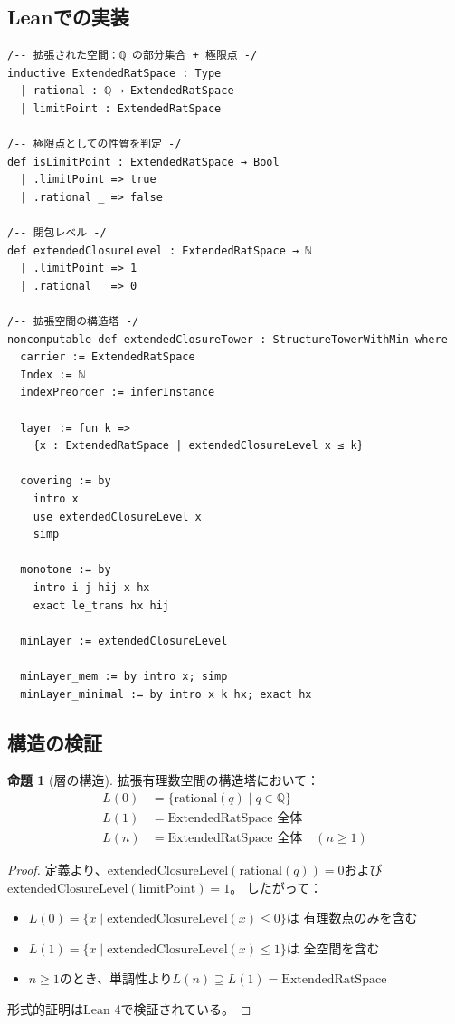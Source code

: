 \documentclass[a4paper,12pt]{ltjsarticle}
\theoremstyle{definition}
\newtheorem{proposition}[definition]{命題}
\begin{document}
\subsection{Leanでの実装}

\begin{lstlisting}[language=Lean]
/-- 拡張された空間：ℚ の部分集合 + 極限点 -/
inductive ExtendedRatSpace : Type
  | rational : ℚ → ExtendedRatSpace
  | limitPoint : ExtendedRatSpace

/-- 極限点としての性質を判定 -/
def isLimitPoint : ExtendedRatSpace → Bool
  | .limitPoint => true
  | .rational _ => false

/-- 閉包レベル -/
def extendedClosureLevel : ExtendedRatSpace → ℕ
  | .limitPoint => 1
  | .rational _ => 0

/-- 拡張空間の構造塔 -/
noncomputable def extendedClosureTower : StructureTowerWithMin where
  carrier := ExtendedRatSpace
  Index := ℕ
  indexPreorder := inferInstance

  layer := fun k =>
    {x : ExtendedRatSpace | extendedClosureLevel x ≤ k}

  covering := by
    intro x
    use extendedClosureLevel x
    simp

  monotone := by
    intro i j hij x hx
    exact le_trans hx hij

  minLayer := extendedClosureLevel

  minLayer_mem := by intro x; simp
  minLayer_minimal := by intro x k hx; exact hx
\end{lstlisting}

\subsection{構造の検証}

\begin{proposition}[層の構造]
拡張有理数空間の構造塔において：
\begin{align*}
L(0) &= \{\mathrm{rational}(q) \mid q \in \mathbb{Q}\} \\
L(1) &= \mathrm{ExtendedRatSpace} \text{ 全体} \\
L(n) &= \mathrm{ExtendedRatSpace} \text{ 全体} \quad (n \geq 1)
\end{align*}
\end{proposition}

\begin{proof}
定義より、$\mathrm{extendedClosureLevel}(\mathrm{rational}(q)) = 0$および
$\mathrm{extendedClosureLevel}(\mathrm{limitPoint}) = 1$。
したがって：
\begin{itemize}
\item $L(0) = \{x \mid \mathrm{extendedClosureLevel}(x) \leq 0\}$は
  有理数点のみを含む
\item $L(1) = \{x \mid \mathrm{extendedClosureLevel}(x) \leq 1\}$は
  全空間を含む
\item $n \geq 1$のとき、単調性より$L(n) \supseteq L(1) = \mathrm{ExtendedRatSpace}$
\end{itemize}
形式的証明はLean 4で検証されている。
\end{proof}
\end{document}
